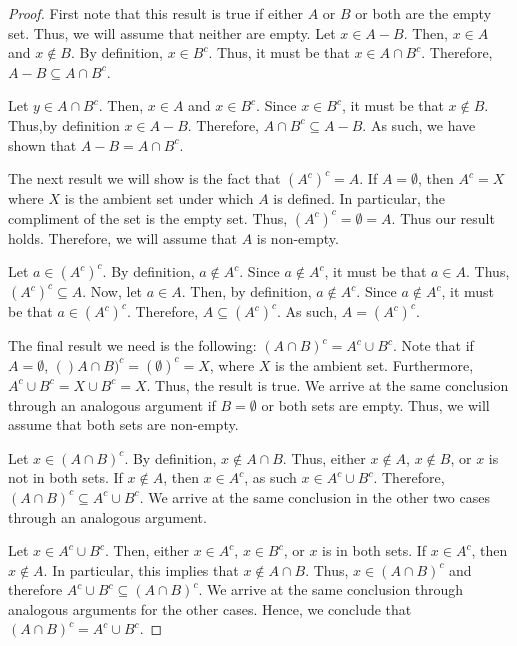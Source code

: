 \documentclass[12pt]{article}
\begin{document}
\begin{enumerate}[label=(\alph*)]
\begin{proof}
		First note that this result is true if either $A$ or $B$ or both are the empty set. Thus,
		we will assume that neither are empty.
		Let $x \in A - B$. Then, $x \in A$ and $x \notin B$. By definition, $x \in B^{c}$. Thus,
		it must be that $x \in A \cap B^{c}$. Therefore, $A - B \subseteq A \cap B^{c}$.
		
		Let $y \in A \cap B^{c}$. Then, $x \in A$ and $x \in B^{c}$. Since $x \in B^{c}$, it must be 
		that $x \notin B$. Thus,by definition $x \in A - B$. Therefore, $A \cap B^{c} \subseteq A -B$.
		As such, we have shown that $A - B = A \cap B^{c}$.
		
		The next result we will show is the fact that $(A^{c})^{c} = A$. If $A = \emptyset$, then
		$A^{c} = X$ where $X$ is the ambient set under which $A$ is defined. In particular,
		the compliment of the set is the empty set. Thus, $(A^{c})^{c} = \emptyset = A$. Thus our 
		result holds. Therefore, we will assume that $A$ is non-empty.
		
		Let $a \in (A^{c})^{c}$. By definition, $a \notin A^{c}$. Since $a \notin A^{c}$, it must 
		be that $a \in A$. Thus, $(A^{c})^{c} \subseteq A$. Now, let $a \in A$. Then, by definition,
		$a \notin A^{c}$. Since $a \notin A^{c}$, it must be that $a \in (A^{c})^{c}$. Therefore,
		$A \subseteq (A^{c})^{c}$. As such, $A = (A^{c})^{c}$.
		
		The final result we need is the following: $(A \cap B)^c = A^c \cup B^c$. 
		Note that if $A = \emptyset$, $()A \cap B)^c = (\emptyset)^c = X$, where $X$
		is the ambient set. Furthermore, $A^c \cup B^c = X \cup B^c = X$. Thus, 
		the result is true. We arrive at the same conclusion through an analogous argument
		if $B = \emptyset$ or both sets are empty. Thus, we will assume that both sets 
		are non-empty.
		
		Let $x \in (A \cap B)^c$. By definition, $x \notin A \cap B$. Thus, either $x \notin
		A$, $x \notin B$, or $x$ is not in both sets. If $x \notin A$, then $x \in A^c$, as 
		such $x \in A^c \cup B^c$. Therefore, $(A \cap B)^c \subseteq A^c \cup B^c$. We 
		arrive at the same conclusion in the other two cases through an analogous 
		argument.
		
		Let $x \in A^c \cup B^c$. Then, either $x \in A^c$, $x \in B^c$, or $x$ is in both
		sets. If $x \in A^c$, then $x \notin A$. In particular, this implies that 
		$x \notin A \cap B$. Thus, $x \in (A \cap B)^c$ and therefore $A^c \cup B^c
		\subseteq (A \cap B)^c$. We arrive at the same conclusion through analogous arguments
		for the other cases. Hence, we conclude that $(A \cap B)^c = A^c \cup B^c$.  
		

\end{proof}
\end{enumerate}
\end{document}
